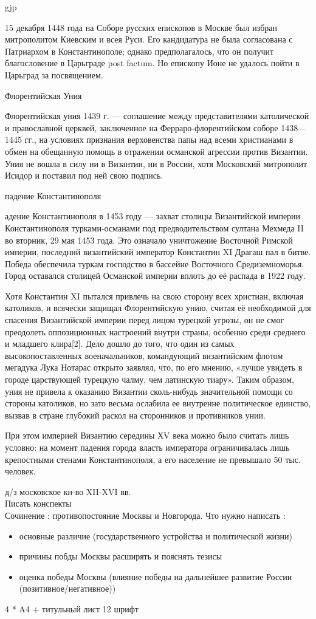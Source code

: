 gjp	 \documentclass[12pt,a4paper]{article}
\begin{document}
15 декабря 1448 года на Соборе русских епископов в Москве был избран митрополитом Киевским и всея Руси. Его кандидатура не была согласована с Патриархом в Константинополе; однако предполагалось, что он получит благословение в Царьграде post factum. Но епископу Ионе не удалось пойти в Царьград за посвящением.
\begin{center}
	Флорентийская Уния
\end{center}
Флорентийская уния 1439 г. — соглашение между представителями католической и православной церквей, заключенное на Ферраро-флорентийском соборе 1438—1445 гг., на условиях признания верховенства папы над всеми христианами в обмен на обещанную помощь в отражении османской агрессии против Византии. Уния не вошла в силу ни в Византии, ни в России, хотя Московский митрополит Исидор и поставил под ней свою подпись.
\begin{center}
	падение Константинополя
\end{center}
адение Константинополя в 1453 году — захват столицы Византийской империи Константинополя турками-османами под предводительством султана Мехмеда II во вторник, 29 мая 1453 года. Это означало уничтожение Восточной Римской империи, последний византийский император Константин XI Драгаш пал в битве. Победа обеспечила туркам господство в бассейне Восточного Средиземноморья. Город оставался столицей Османской империи вплоть до её распада в 1922 году.

Хотя Константин XI пытался привлечь на свою сторону всех христиан, включая католиков, и всячески защищал Флорентийскую унию, считая её необходимой для спасения Византийской империи перед лицом турецкой угрозы, он не смог преодолеть оппозиционных настроений внутри страны, особенно среди среднего и младшего клира[2]. Дело дошло до того, что один из самых высокопоставленных военачальников, командующий византийским флотом мегадука Лука Нотарас открыто заявлял, что, по его мнению, «лучше увидеть в городе царствующей турецкую чалму, чем латинскую тиару». Таким образом, уния не привела к оказанию Византии сколь-нибудь значительной помощи со стороны католиков, но зато весьма ослабила ее внутренне политическое единство, вызвав в стране глубокий раскол на сторонников и противников унии.

При этом империей Византию середины ХV века можно было считать лишь условно: на момент падения города власть императора ограничивалась лишь крепостными стенами Константинополя, а его население не превышало 50 тыс. человек.

{\Huge д/з московское кн-во XII-XVI вв.\\ Писать конспекты\\Сочинение : противопостояние Москвы и Новгорода. Что нужно написать : 
\begin{itemize}
\item основные различие (государственного устройства и политической жизни) 
\item причины побды Москвы расширять и пояснять тезисы
\item оценка победы Москвы (влияние победы на дальнейшее развитие России (позитивное/негативное))
\end{itemize}
4 * A4 + титульный лист
12 шрифт}
\end{document}
